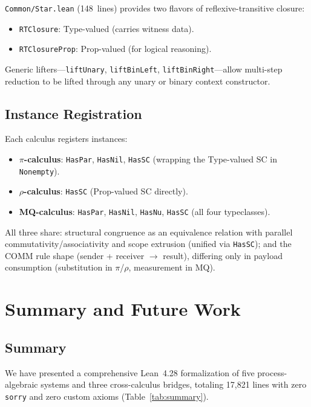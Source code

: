 \documentclass[11pt]{article}
\theoremstyle{definition}
\theoremstyle{remark}
\begin{document}
\texttt{Common/Star.lean} (148~lines) provides two flavors of
reflexive-transitive closure:
\begin{itemize}[leftmargin=1.5em]
  \item \texttt{RTClosure}: Type-valued (carries witness data).
  \item \texttt{RTClosureProp}: Prop-valued (for logical reasoning).
\end{itemize}
Generic lifters---\texttt{liftUnary}, \texttt{liftBinLeft},
\texttt{liftBinRight}---allow multi-step reduction to be lifted
through any unary or binary context constructor.

\subsection{Instance Registration}

Each calculus registers instances:
\begin{itemize}[leftmargin=1.5em]
  \item \textbf{$\pi$-calculus}: \texttt{HasPar}, \texttt{HasNil},
    \texttt{HasSC} (wrapping the Type-valued SC in \texttt{Nonempty}).
  \item \textbf{$\rho$-calculus}: \texttt{HasSC} (Prop-valued SC
    directly).
  \item \textbf{MQ-calculus}: \texttt{HasPar}, \texttt{HasNil},
    \texttt{HasNu}, \texttt{HasSC} (all four typeclasses).
\end{itemize}

\noindent
All three share: structural congruence as an equivalence relation with
parallel commutativity/associativity and scope extrusion (unified via
\texttt{HasSC}); and the COMM rule shape (sender + receiver $\to$
result), differing only in payload consumption (substitution in
$\pi$/$\rho$, measurement in MQ).


\section{Summary and Future Work}
\label{sec:conclusion}

\subsection{Summary}

We have presented a comprehensive Lean~4.28 formalization of five
process-algebraic systems and three cross-calculus bridges, totaling
17{,}821 lines with zero \texttt{sorry} and zero custom axioms
(Table~\ref{tab:summary}).
\end{document}

